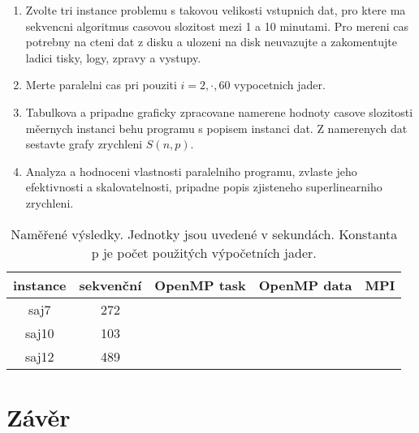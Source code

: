 \documentclass{article}
\begin{document}
    \begin{enumerate}
        \item Zvolte tri instance problemu s takovou velikosti vstupnich dat, pro ktere ma sekvencni
        algoritmus casovou slozitost mezi 1 a 10 minutami.
        Pro mereni cas potrebny na cteni dat z disku a ulozeni na disk neuvazujte a zakomentujte
        ladici tisky, logy, zpravy a vystupy.
        \item Merte paralelni cas pri pouziti $i=2,\cdot,60$ vypocetnich jader.
        \item Tabulkova a pripadne graficky zpracovane namerene hodnoty casove slozitosti měernych instanci behu programu s popisem instanci dat. Z namerenych dat sestavte grafy zrychleni $S(n,p)$.
        \item Analyza a hodnoceni vlastnosti paralelniho programu, zvlaste jeho efektivnosti a skalovatelnosti, pripadne popis zjisteneho superlinearniho zrychleni.
    \end{enumerate}

    \begin{table}[]
        \centering
        \begin{tabular}{|c|c|c|c|c|}
            \hline
            \multicolumn{1}{|l|}{instance} & \multicolumn{1}{l|}{sekvenční} & \multicolumn{1}{l|}{OpenMP task} & \multicolumn{1}{l|}{OpenMP data} & \multicolumn{1}{l|}{MPI} \\ \hline
            saj7                           & 272                            &                                  &                                  &                          \\ \hline
            saj10                          & 103                            &                                  &                                  &                          \\ \hline
            saj12                          & 489                            &                                  &                                  &                          \\ \hline
        \end{tabular}
        \caption{Naměřené výsledky. Jednotky jsou uvedené v sekundách. Konstanta p je počet použitých výpočetních
        jader.
        }
        \label{tab:results}
    \end{table}


    \section{Závěr}
\end{document}
